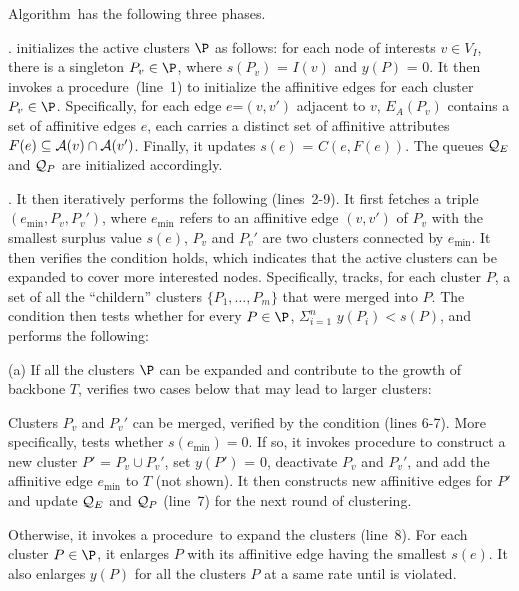 \vspace{.5ex}
Algorithm~\approxabd has the following three phases.

.
\approxabd initializes the active clusters $\P$ as
follows: for each node of interests $v\in V_I$,
there is a singleton $P_v\in \P$, where
$s(P_v)$ = $I(v)$ and $y(P)$ = $0$.
It then invokes a procedure~\updateAE (line~1)
to initialize the affinitive edges for
each cluster $P_v\in \P$.
Specifically, for each edge $e$=$(v,v')$ adjacent to
$v$, $E_A(P_v)$ contains a set of
affinitive edges $e$, each carries a distinct set of
affinitive attributes $F(e)\subseteq \A(v)\cap\A(v')$.
Finally, it updates $s(e)$ = $C(e, F(e))$.
The queues $\Q_E$ and $\Q_P$ are initialized
accordingly.

.
It then iteratively performs the following (lines~2-9).
It first fetches a triple $(e_{\min}, P_v, P_v')$, where
$e_{\min}$ refers to an affinitive edge $(v,v')$ of $P_v$ with the
smallest surplus value $s(e)$, $P_v$ and $P_v'$ are two clusters
connected by $e_{\min}$. It then verifies
the condition \isgrow holds, which indicates that the
active clusters can be expanded to cover more interested nodes.
Specifically, \approxabd tracks, for each
cluster $P$, a set of all the ``childern''  clusters $\{P_1, \ldots, P_m\}$ that were merged into $P$.
The condition \isgrow then tests
whether for every $P\in \P$,
$\Sigma^n_{i=1}$ $y(P_i)< s(P)$,
and performs the following:

\sstab
(a) If all the clusters $\P$ can be
expanded and contribute to the growth
of backbone $T$, \approxabd verifies 
two cases below that may lead to larger clusters:

\tbi
\item Clusters $P_v$ and $P_v'$ can be merged, verified by
the condition \ismerge (lines 6-7). More specifically, \ismerge tests whether
$s(e_{\min}) = 0$.
If so, it invokes procedure \merge to
construct a new cluster $P'$ = $P_v\cup P_v'$,
set $y(P')$ = $0$,
deactivate $P_v$ and $P_v'$, and
add the affinitive edge $e_{\min}$ to
$T$ %
(not shown).
It then constructs new affinitive edges for $P'$
and update $\Q_E$ and $\Q_P$ (line~7) for the next
round of clustering.

\vspace{.5ex}
\item Otherwise, it invokes a procedure~\grow to expand the clusters (line~8).
For each cluster $P\in \P$, it enlarges $P$
with its affinitive edge having the smallest $s(e)$.
It also enlarges $y(P)$ for all the clusters
$P$ at a same rate until \isgrow is violated.
\ei

